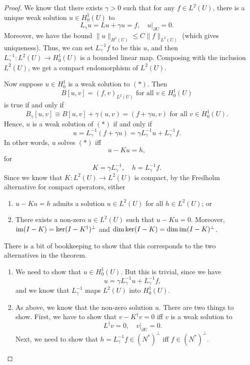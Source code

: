 \documentclass[a4paper]{article}
\begin{document}
\begin{proof}
  We know that there exists $\gamma > 0$ such that for any $f \in L^2(U)$, there is a unique weak solution $u \in H_0^1(U)$ to
  \[
    L_\gamma u = Lu + \gamma u = f,\quad u|_{\partial U} = 0.
  \]
  Moreover, we have the bound $\|u\|_{H^1(U)} \leq C \|f\|_{L^2(U)}$ (which gives uniqueness). Thus, we can set $L_\gamma^{-1} f$ to be this $u$, and then $L_\gamma^{-1}: L^2(U) \to H_0^1(U)$ is a bounded linear map. Composing with the inclusion $L^2(U)$, we get a compact endomorphism of $L^2(U)$.

  Now suppose $u \in H_0^1$ is a weak solution to $(*)$. Then
  \[
    B[u, v] = (f, v)_{L^2(U)} \text{ for all }v \in H_0^1(U)
  \]
  is true if and only if
  \[
    B_\gamma[u, v] \equiv B[u, v] + \gamma(u, v) = (f + \gamma u, v) \text{ for all }v \in H_0^1(U).
  \]
  Hence, $u$ is a weak solution of $(*)$ if and only if
  \[
    u = L_\gamma^{-1}(f + \gamma u) = \gamma L_\gamma^{-1} u + L_\gamma^{-1} f.
  \]
  In other words, $u$ solves $(*)$ iff
  \[
    u - Ku = h,
  \]
  for
  \[
    K = \gamma L_\gamma^{-1},\quad h = L_\gamma^{-1} f.
  \]
  Since we know that $K: L^2(U) \to L^2(U)$ is compact, by the Fredholm alternative for compact operators, either
  \begin{enumerate}
    \item $u - Ku = h$ admits a solution $u \in L^2(U)$ for all $h \in L^2(U)$; or
    \item There exists a non-zero $u \in L^2(U)$ such that $u - Ku = 0$. Moreover, $\operatorname{im} (I - K) = \ker (I - K^\dagger)^\perp$ and $\dim \ker (I - K) = \dim \operatorname{im} (I - K)^\perp$.
  \end{enumerate}
  There is a bit of bookkeeping to show that this corresponds to the two alternatives in the theorem.

  \begin{enumerate}
    \item We need to show that $u \in H_0^1(U)$. But this is trivial, since we have
      \[
        u = \gamma L_\gamma^{-1} u + L_{\gamma}^{-1} f,
      \]
      and we know that $L_\gamma^{-1}$ maps $L^2(U)$ into $H_0^1(U)$.

    \item As above, we know that the non-zero solution $u$. There are two things to show. First, we have to show that $v - K^\dagger v = 0$ iff $v$ is a weak solution to
      \[
        L^\dagger v = 0,\quad v|_{\partial U} = 0.
      \]
      Next, we need to show that $h = L_\gamma^{-1} f \in (N^*)^\perp$ iff $f \in (N^*)^\perp$.


\end{enumerate}
\end{proof}
\end{document}

